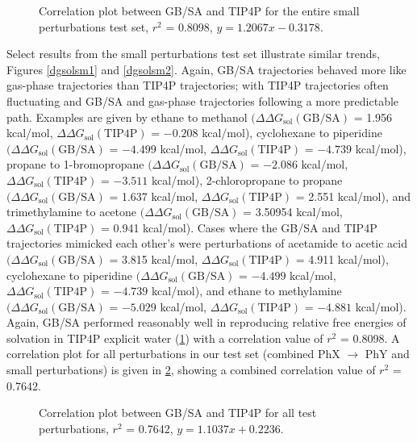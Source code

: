 \documentclass[12pt]{report}
\begin{document}
\begin{figure}[t!]
\centering

\caption{Correlation plot between GB/SA and TIP4P for the entire small perturbations test set, $r^2$ = 0.8098, $y = 1.2067x - 0.3178$.}
\label{corrsmall}
\end{figure}

Select results from the small perturbations test set illustrate similar trends, Figures \ref{dgsolsm1} and \ref{dgsolsm2}. Again, GB/SA trajectories behaved more like gas-phase trajectories than TIP4P trajectories; with TIP4P trajectories often fluctuating and GB/SA and gas-phase trajectories following a more predictable path. Examples are given by 
ethane to methanol 
$(\Delta\Delta G_{ \textrm{sol}}(\textrm{GB/SA})$ = 1.956 kcal/mol, 
$\Delta\Delta G_{ \textrm{sol}}(\textrm{TIP4P})$ = $-0.208$ kcal/mol), 
cyclohexane to piperidine 
$(\Delta\Delta G_{ \textrm{sol}}(\textrm{GB/SA})$ = $-4.499$ kcal/mol, 
$\Delta\Delta G_{ \textrm{sol}}(\textrm{TIP4P})$ = $-4.739$ kcal/mol), 
propane to 1-bromopropane 
$(\Delta\Delta G_{ \textrm{sol}}(\textrm{GB/SA})$ = $-2.086$ kcal/mol, 
$\Delta\Delta G_{ \textrm{sol}}(\textrm{TIP4P})$ = $-3.511$ kcal/mol), 
2-chloropropane to propane 
$(\Delta\Delta G_{ \textrm{sol}}(\textrm{GB/SA})$ = 1.637 kcal/mol, 
$\Delta\Delta G_{ \textrm{sol}}(\textrm{TIP4P})$ = 2.551 kcal/mol), 
and trimethylamine to acetone 
$(\Delta\Delta G_{ \textrm{sol}}(\textrm{GB/SA})$ = 3.50954 kcal/mol, 
$\Delta\Delta G_{ \textrm{sol}}(\textrm{TIP4P})$ = 0.941 kcal/mol). 
Cases where the GB/SA and TIP4P trajectories mimicked each other's were perturbations of 
acetamide to acetic acid 
$(\Delta\Delta G_{ \textrm{sol}}(\textrm{GB/SA})$ = 3.815 kcal/mol, 
$\Delta\Delta G_{ \textrm{sol}}(\textrm{TIP4P})$ = 4.911 kcal/mol), 
cyclohexane to piperidine 
$(\Delta\Delta G_{ \textrm{sol}}(\textrm{GB/SA})$ = $-4.499$ kcal/mol, 
$\Delta\Delta G_{ \textrm{sol}}(\textrm{TIP4P})$ = $-4.739$ kcal/mol), 
and ethane to methylamine 
$(\Delta\Delta G_{ \textrm{sol}}(\textrm{GB/SA})$ = $-5.029$ kcal/mol, 
$\Delta\Delta G_{ \textrm{sol}}(\textrm{TIP4P})$ = $-4.881$ kcal/mol). 
Again, GB/SA performed reasonably well in reproducing relative free energies of solvation in TIP4P explicit water (\cref{corrsmall}) with a correlation value of $r^2$ = 0.8098. A correlation plot for all perturbations in our test set (combined PhX $\longrightarrow$ PhY and small perturbations) is given in \cref{corrall}, showing a combined correlation value of $r^2$ = 0.7642.

\begin{figure}[t!]
\centering

\caption{Correlation plot between GB/SA and TIP4P for all test perturbations, $r^2$ = 0.7642, $y = 1.1037x + 0.2236$.}
\label{corrall}
\end{figure}
\end{document}
